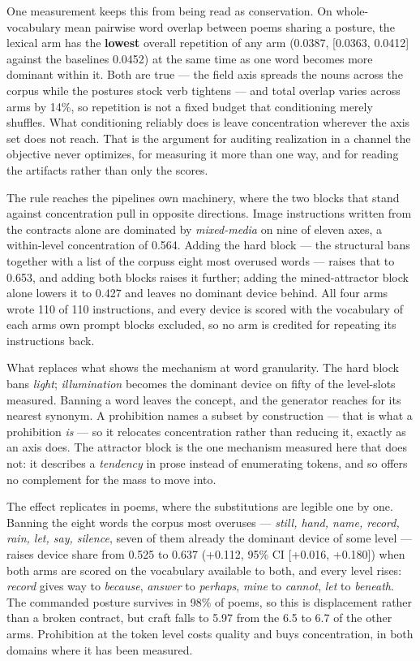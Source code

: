 \documentclass[
  10pt,
]{article}
\theoremstyle{plain}
\theoremstyle{definition}
\begin{document}
One measurement keeps this from being read as conservation. On
whole-vocabulary mean pairwise word overlap between poems sharing a
posture, the lexical arm has the \textbf{lowest} overall repetition of
any arm (0.0387, {[}0.0363, 0.0412{]} against the
baseline\textquotesingle s 0.0452) at the same time as one word becomes
more dominant within it. Both are true --- the field axis spreads the
nouns across the corpus while the posture\textquotesingle s stock verb
tightens --- and total overlap varies across arms by 14\%, so repetition
is not a fixed budget that conditioning merely shuffles. What
conditioning reliably does is leave concentration wherever the axis set
does not reach. That is the argument for auditing realization in a
channel the objective never optimizes, for measuring it more than one
way, and for reading the artifacts rather than only the scores.

The rule reaches the pipeline\textquotesingle s own machinery, where the
two blocks that stand against concentration pull in opposite directions.
Image instructions written from the contracts alone are dominated by
\emph{mixed-media} on nine of eleven axes, a within-level concentration
of 0.564. Adding the hard block --- the structural bans together with a
list of the corpus\textquotesingle s eight most overused words ---
raises that to 0.653, and adding both blocks raises it further; adding
the mined-attractor block alone lowers it to 0.427 and leaves no
dominant device behind. All four arms wrote 110 of 110 instructions, and
every device is scored with the vocabulary of each arm\textquotesingle s
own prompt blocks excluded, so no arm is credited for repeating its
instructions back.

What replaces what shows the mechanism at word granularity. The hard
block bans \emph{light}; \emph{illumination} becomes the dominant device
on fifty of the level-slots measured. Banning a word leaves the concept,
and the generator reaches for its nearest synonym. A prohibition names a
subset by construction --- that is what a prohibition \emph{is} --- so
it relocates concentration rather than reducing it, exactly as an axis
does. The attractor block is the one mechanism measured here that does
not: it describes a \emph{tendency} in prose instead of enumerating
tokens, and so offers no complement for the mass to move into.

The effect replicates in poems, where the substitutions are legible one
by one. Banning the eight words the corpus most overuses ---
\emph{still, hand, name, record, rain, let, say, silence}, seven of them
already the dominant device of some level --- raises device share from
0.525 to 0.637 (+0.112, 95\% CI {[}+0.016, +0.180{]}) when both arms are
scored on the vocabulary available to both, and every level rises:
\emph{record} gives way to \emph{because}, \emph{answer} to
\emph{perhaps}, \emph{mine} to \emph{cannot}, \emph{let} to
\emph{beneath}. The commanded posture survives in 98\% of poems, so this
is displacement rather than a broken contract, but craft falls to 5.97
from the 6.5 to 6.7 of the other arms. Prohibition at the token level
costs quality and buys concentration, in both domains where it has been
measured.
\end{document}
